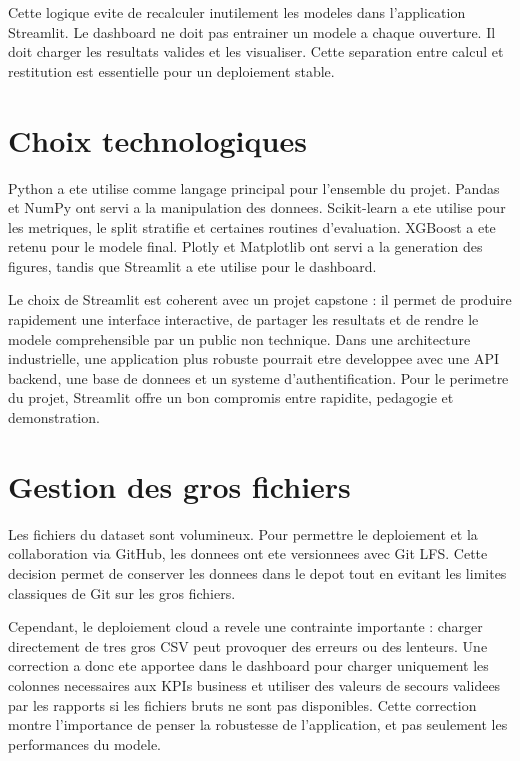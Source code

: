 ﻿\documentclass[12pt,a4paper,oneside]{report}
\begin{document}
Cette logique evite de recalculer inutilement les modeles dans l'application Streamlit. Le dashboard ne doit pas entrainer un modele a chaque ouverture. Il doit charger les resultats valides et les visualiser. Cette separation entre calcul et restitution est essentielle pour un deploiement stable.

\section{Choix technologiques}

Python a ete utilise comme langage principal pour l'ensemble du projet. Pandas et NumPy ont servi a la manipulation des donnees. Scikit-learn a ete utilise pour les metriques, le split stratifie et certaines routines d'evaluation. XGBoost a ete retenu pour le modele final. Plotly et Matplotlib ont servi a la generation des figures, tandis que Streamlit a ete utilise pour le dashboard.

Le choix de Streamlit est coherent avec un projet capstone : il permet de produire rapidement une interface interactive, de partager les resultats et de rendre le modele comprehensible par un public non technique. Dans une architecture industrielle, une application plus robuste pourrait etre developpee avec une API backend, une base de donnees et un systeme d'authentification. Pour le perimetre du projet, Streamlit offre un bon compromis entre rapidite, pedagogie et demonstration.

\section{Gestion des gros fichiers}

Les fichiers du dataset sont volumineux. Pour permettre le deploiement et la collaboration via GitHub, les donnees ont ete versionnees avec Git LFS. Cette decision permet de conserver les donnees dans le depot tout en evitant les limites classiques de Git sur les gros fichiers.

Cependant, le deploiement cloud a revele une contrainte importante : charger directement de tres gros CSV peut provoquer des erreurs ou des lenteurs. Une correction a donc ete apportee dans le dashboard pour charger uniquement les colonnes necessaires aux KPIs business et utiliser des valeurs de secours validees par les rapports si les fichiers bruts ne sont pas disponibles. Cette correction montre l'importance de penser la robustesse de l'application, et pas seulement les performances du modele.
\end{document}
